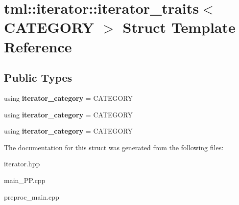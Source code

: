 \hypertarget{structtml_1_1iterator_1_1iterator__traits}{\section{tml\+:\+:iterator\+:\+:iterator\+\_\+traits$<$ C\+A\+T\+E\+G\+O\+R\+Y $>$ Struct Template Reference}
\label{structtml_1_1iterator_1_1iterator__traits}
}
\subsection*{Public Types}
\begin{DoxyCompactItemize}
\item 
\hypertarget{structtml_1_1iterator_1_1iterator__traits_ae2133b6fbf543ea7645c1b68c9bb1c42}{using {\bfseries iterator\+\_\+category} = C\+A\+T\+E\+G\+O\+R\+Y}\label{structtml_1_1iterator_1_1iterator__traits_ae2133b6fbf543ea7645c1b68c9bb1c42}

\item 
\hypertarget{structtml_1_1iterator_1_1iterator__traits_ae2133b6fbf543ea7645c1b68c9bb1c42}{using {\bfseries iterator\+\_\+category} = C\+A\+T\+E\+G\+O\+R\+Y}\label{structtml_1_1iterator_1_1iterator__traits_ae2133b6fbf543ea7645c1b68c9bb1c42}

\item 
\hypertarget{structtml_1_1iterator_1_1iterator__traits_ae2133b6fbf543ea7645c1b68c9bb1c42}{using {\bfseries iterator\+\_\+category} = C\+A\+T\+E\+G\+O\+R\+Y}\label{structtml_1_1iterator_1_1iterator__traits_ae2133b6fbf543ea7645c1b68c9bb1c42}

\end{DoxyCompactItemize}


The documentation for this struct was generated from the following files\+:\begin{DoxyCompactItemize}
\item 
iterator.\+hpp\item 
main\+\_\+\+P\+P.\+cpp\item 
preproc\+\_\+main.\+cpp\end{DoxyCompactItemize}
